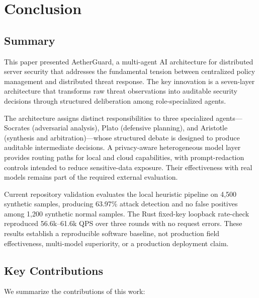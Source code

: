 
\section{Conclusion}
\label{sec:conclusion}

\subsection{Summary}

This paper presented AetherGuard, a multi-agent AI architecture for distributed server security that addresses the fundamental tension between centralized policy management and distributed threat response. The key innovation is a seven-layer architecture that transforms raw threat observations into auditable security decisions through structured deliberation among role-specialized agents.

The architecture assigns distinct responsibilities to three specialized agents---Socrates (adversarial analysis), Plato (defensive planning), and Aristotle (synthesis and arbitration)---whose structured debate is designed to produce auditable intermediate decisions. A privacy-aware heterogeneous model layer provides routing paths for local and cloud capabilities, with prompt-redaction controls intended to reduce sensitive-data exposure. Their effectiveness with real models remains part of the required external evaluation.

Current repository validation evaluates the local heuristic pipeline on 4,500 synthetic samples, producing 63.97\% attack detection and no false positives among 1,200 synthetic normal samples. The Rust fixed-key loopback rate-check reproduced 56.6k--61.6k QPS over three rounds with no request errors. These results establish a reproducible software baseline, not production field effectiveness, multi-model superiority, or a production deployment claim.

\subsection{Key Contributions}

We summarize the contributions of this work:

